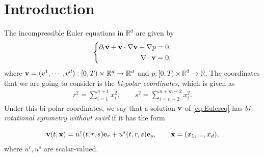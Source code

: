 \documentclass[11pt]{amsart}
\newcommand{\Red}[1]{\begingroup\color{red} #1\endgroup} %
\newcommand{\Blue}[1]{\begingroup\color{blue} #1\endgroup}
\newcommand{\Green}[1]{\begingroup\color{green} #1\endgroup}
\theoremstyle{definition}
\theoremstyle{remark}
\numberwithin{equation}{section}
\numberwithin{equation}{section}
\newcommand{\rd}{\partial}
\newcommand{\nb}{\nabla}
\newcommand{\0}{\emptyset}
\newcommand{\tht}{\theta}
\newcommand{\bfe}{{\bf e}}
\newcommand{\bfv}{{\bf v}}
\newcommand{\bfx}{{\bf x}}
\newcommand{\bbR}{\mathbb R}
\begin{document}

	
	\section{Introduction}\label{sec:intro}
	
	The incompressible Euler equations in $\bbR^d$ are given by
	\begin{equation}\label{eq:Eulereq}
		\left\{
		\begin{aligned}
			\rd_{t} \bfv +  \bfv \cdot\nb \bfv +\nb p&=0,\\
			\nb\cdot \bfv &=0, 
		\end{aligned}
		\right.
	\end{equation}
	where $ \bfv = (v^{1},\cdots,v^{d}) : [0,T)\times\bbR^{d}\to\bbR^{d} $ and $ p : [0,T)\times\bbR^{d}\to\bbR $. The coordinates that we are going to consider is the \textit{bi-polar coordinates,} which is given as
	\begin{equation*}
		\begin{aligned}
			r^{2} = \sum_{i=1}^{n+1}x_{i}^{2}, \qquad s^{2} = \sum_{i=n+2}^{n+m+2}x_{i}^{2}. 
		\end{aligned}
	\end{equation*}
	Under this bi-polar coordinates, we say that a solution $ \bfv $ of \eqref{eq:Eulereq} has \textit{bi-rotational symmetry without swirl} if it has the form

	\begin{equation}\label{eq:birothighd}
		\bfv(t,\bfx) = u^{r}(t,r,s)\bfe_{r} + u^{s}(t,r,s)\bfe_{s}, \qquad \bfx = (x_{1},...,x_{d}), 
	\end{equation} where $u^{r}, u^{s}$ are scalar-valued. 
	
\end{document}
